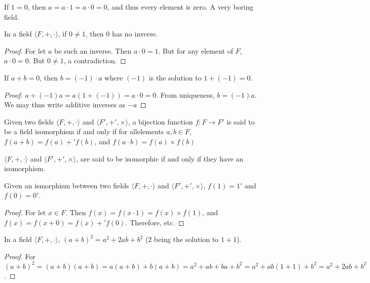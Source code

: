         If $1=0$, then $a=a\cdot{1}=a\cdot{0}=0$, and thus every element is
        zero. A very boring field.
        \begin{theorem}
            In a field $\langle F, +,\cdot \rangle$, if $0\ne 1$, then $0$
            has no inverse.
        \end{theorem}
        \begin{proof}
        For let $a$ be such an inverse. Then $a\cdot 0 = 1$. But for any element of $F$, $a \cdot 0 = 0$. But $0\ne 1$, a contradiction.
        \end{proof}
        \begin{theorem}
        If $a+b = 0$, then $b= (-1)\cdot a$ where $(-1)$ is the solution to $1+(-1)=0$.
        \end{theorem}
        \begin{proof}
        $a+(-1)a = a(1+(-1)) = a\cdot 0 = 0$. From uniqueness, $b=(-1)a$. We may thus write additive inverses as $-a$
        \end{proof}
        \begin{definition}
        Given two fields $\langle F,+,\cdot \rangle$ and $\langle F', +',\times \rangle$, a bijection function $f:F\rightarrow F'$ is said to be a field isomorphism if and only if for allelements $a,b\in F$, $f(a+b)=f(a)+'f(b)$, and $f(a\cdot b) = f(a)\times f(b)$
        \end{definition}
        \begin{definition}
        $\langle F,+,\cdot \rangle$ and $\langle F', +',\times \rangle$, are said to be isomorphic if and only if they have an isomorphism.
        \end{definition}
        \begin{theorem}
        Given an ismorphism between two fields $\langle F,+,\cdot \rangle$ and $\langle F', +',\times \rangle$, $f(1) = 1'$ and $f(0) = 0'$.
        \end{theorem}
        \begin{proof}
        For let $x\in F$. Then $f(x)=f(x\cdot 1) = f(x)\times f(1)$, and $f(x)=f(x+0) = f(x)+'f(0)$. Therefore, etc.
        \end{proof}
        \begin{theorem}
        In a field $\langle F,+,\cdot \rangle$, $(a+ b)^2 = a^2 + 2ab + b^2$ ($2$ being the solution to $1+1$).
        \end{theorem}
        \begin{proof}
        For $(a+b)^2 = (a+b)(a+b) = a(a+b)+b(a+b) = a^2 + ab + ba + b^2 = a^2 +ab(1+1)+b^2 = a^2 + 2ab + b^2$.
        \end{proof}
